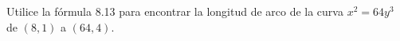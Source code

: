\item Utilice la fórmula 8.13 para encontrar la longitud de arco de la curva $x^2 = 64y^3$ de $(8, 1)$ a $(64, 4)$.
